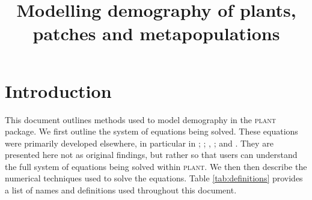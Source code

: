 \documentclass[10pt,twoside]{article}
\title{Modelling demography of plants, patches and metapopulations}
\date{}
\newcommand{\plant}{\textsc{plant}}
\begin{document}
\maketitle

\tableofcontents

\section{Introduction}

This document outlines methods used to model demography in the {\plant}
package. We first outline the system of equations being solved. These equations were primarily
developed elsewhere, in particular in
\citet{Deroos-1997}; \citet{Kohyama-1993}; \citet{Moorcroft-2001}, \citet{Falster-2011}; and
\citet{Falster-2015}. They are presented here not as original findings, but rather so that
users can understand the full system of equations being solved within {\plant}.
We then then describe the numerical techniques used to solve the equations.
Table \ref{tab:definitions} provides a list of names and definitions used
throughout this document.
\end{document}
